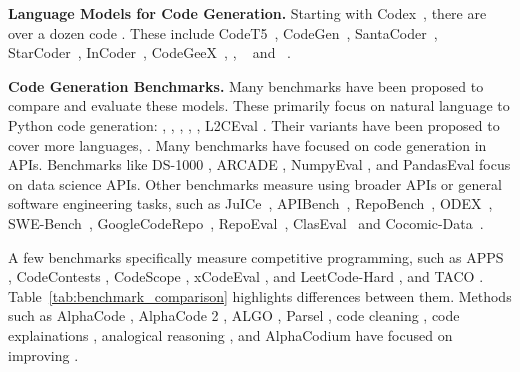 \noindent \textbf{Language Models for Code Generation.} 
Starting with Codex~\citep{chen2021evaluating}, there are over a dozen code \llms{}. These include CodeT5~\citep{wang2021codet5, wang2023codet5+}, CodeGen~\citep{nijkamp2022codegen}, SantaCoder~\citep{allal2023santacoder}, StarCoder~\citep{li2023starcoder,starcoder2}, InCoder~\citep{fried2022incoder}, CodeGeeX~\citep{zheng2023codegeex}, \llamabase{}, \deepseek{}~\citep{bi2024deepseek} and \cllama{}~\citep{roziere2023code}. 


\noindent \textbf{Code Generation Benchmarks.} 
Many benchmarks have been proposed to compare and evaluate these models. 
These primarily focus on natural language to Python code generation: 
\humaneval{} \citep{chen2021evaluating}, 
\humanevalplus{} \citep{liu2023your}, 
\apps{} \citep{hendrycks2021measuring}, 
\contests{} \citep{li2022competition}, 
\mbpp{} \citep{austin2021program}, 
L2CEval \citep{ni2023l2ceval}. 
Their variants have been proposed to cover more languages, \citep{wang2022recode, zheng2023codegeex, cassano2022multipl, athiwaratkun2022multi}.
Many benchmarks have focused on code generation in APIs. Benchmarks like DS-1000 \citep{lai2023ds}, ARCADE \citep{yin2022natural}, NumpyEval \citep{zhang2023toolcoder}, and PandasEval \citep{jain2022jigsaw} focus on data science APIs. 
Other benchmarks measure using broader APIs or 
general software engineering tasks, such as JuICe~\citep{agashe2019juice}, APIBench~\citep{patil2023gorilla}, RepoBench~\citep{liu2023repobench}, ODEX~\citep{wang2022execution}, SWE-Bench~\citep{jimenez2023swe}, GoogleCodeRepo~\citep{shrivastava2023repository}, RepoEval~\citep{zhang2023repocoder}, 
ClasEval~\citep{du2023classeval} and Cocomic-Data~\citep{ding2022cocomic}.~

A few benchmarks specifically measure competitive programming, such as 
APPS \citep{hendrycks2021measuring}, 
CodeContests \citep{li2022competition}, 
CodeScope \citep{yan2023codescope},
xCodeEval \citep{khan2023xcodeeval},
and LeetCode-Hard \citep{shinn2023reflexion}, and TACO \citep{li2023taco}. 
Table~\ref{tab:benchmark_comparison} highlights differences between them.
Methods such as AlphaCode \citep{li2022competition}, AlphaCode 2 \citep{team2023gemini}, ALGO \citep{zhang2023algo}, Parsel \citep{zelikman2022parsel}, code cleaning \citep{jain2023llm}, code explainations \citep{li2023explaining}, analogical reasoning \citep{yasunaga2023large}, and AlphaCodium \citep{ridnik2024code} have focused on improving \llms{}. 

